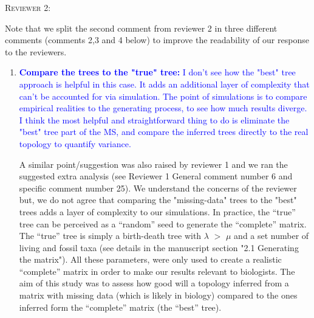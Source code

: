 \documentclass[12pt,letterpaper]{article}
\renewcommand{\section}[1]{%
\bigskip
\begin{center}
\begin{Large}
\normalfont\scshape #1
\medskip
\end{Large}
\end{center}}
\begin{document}
\section{Reviewer 2:}
Note that we split the second comment from reviewer 2 in three different comments (comments 2,3 and 4 below) to improve the readability of our response to the reviewers.

\begin{enumerate}
\item{\textcolor{blue}{\textbf{Compare the trees to the "true" tree:} I don't see how the "best" tree approach is helpful in this case. It adds an additional layer of complexity that can't be accounted for via simulation. The point of simulations is to compare empirical realities to the generating process, to see how much results diverge. I think the most helpful and straightforward thing to do is eliminate the "best" tree part of the MS, and compare the inferred trees directly to the real topology to quantify variance.}}

A similar point/suggestion was also raised by reviewer 1 and we ran the suggested extra analysis (see Reviewer 1 General comment number 6 and specific comment number 25).
We understand the concerns of the reviewer but, we do not agree that comparing the "missing-data" trees to the "best" trees adds a layer of complexity to our simulations.
In practice, the ``true'' tree can be perceived as a ``random'' seed to generate the ``complete'' matrix.
The ``true'' tree is simply a birth-death tree with $\lambda$ $>$ $\mu$ and a set number of living and fossil taxa (see details in the manuscript section "2.1 Generating the matrix").
All these parameters, were only used to create a realistic ``complete'' matrix in order to make our results relevant to biologists.
The aim of this study was to assess how good will a topology inferred from a matrix with missing data (which is likely in biology) compared to the ones inferred form the ``complete'' matrix (the ``best'' tree).



\end{enumerate}
\end{document}
